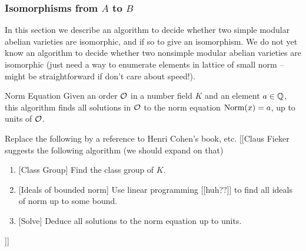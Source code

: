 \documentclass{article}
\begin{document}
\subsubsection{Isomorphisms from $A$ to $B$}

In this section we describe an algorithm to decide whether two simple
modular abelian varieties are isomorphic, and if so to give an
isomorphism.  We do not yet know an algorithm to decide whether two
nonsimple modular abelian varieties are isomorphic (just need a way
to enumerate elements in lattice of small norm -- might be straightforward
if don't care about speed!).

\begin{algorithm}{Norm Equation}
	Given an order $\mathcal{O}$ in a number field $K$ and an element $a\in \mathbb{Q}$,
	this algorithm finds all solutions in $\mathcal{O}$ to the norm equation
	$\operatorname{Norm}(x)=a$, up to units of $\mathcal{O}$.

	Replace the following by a reference to Henri Cohen's book, etc.
	[[Claus Fieker suggests the following algorithm (we should expand on that)
	\begin{enumerate}
		\item{} [Class Group] Find the class group of $K$.
		\item{} [Ideals of bounded norm] Use linear programming [[huh??]] to find all ideals of
		      norm up to some bound.
		\item{} [Solve] Deduce all solutions to the norm equation up to units.
	\end{enumerate}
\end{algorithm}
]]
\end{document}
